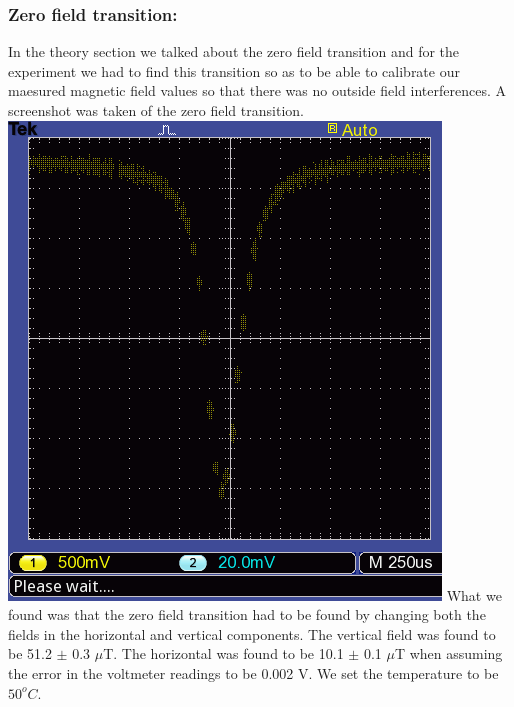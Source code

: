 \documentclass[twocolumn]{article}
\begin{document}
\subsubsection{Zero field transition:}
In the theory section we talked about the zero field transition and for the 
experiment we had to find this transition so as to be able to calibrate our 
maesured magnetic field values so that there was no outside field 
interferences. A screenshot was taken of the zero field transition.
\center
\includegraphics[width=\linewidth]{pictures/zero-field-data.png}
\label{fig:22}
\justify
What we found was that the zero field transition had to be found by changing 
both the fields in the horizontal and vertical components. The vertical field 
was found to be 51.2 $\pm$ 0.3 $\mu$T. The horizontal was found to be 10.1 
$\pm$ 0.1 $\mu$T when assuming the error in the voltmeter readings to be 
0.002 V. We set the temperature to be $50^oC$.
\end{document}
